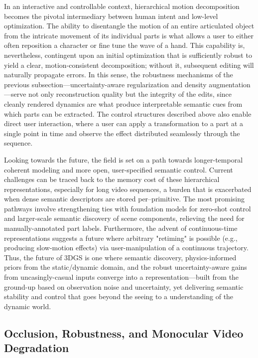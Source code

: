 \documentclass[11pt,a4paper]{article}
\begin{document}
In an interactive and controllable context, hierarchical motion decomposition becomes the pivotal intermediary between human intent and low-level optimization. The ability to disentangle the motion of an entire articulated object from the intricate movement of its individual parts is what allows a user to either often reposition a character or fine tune the wave of a hand. This capability is, nevertheless, contingent upon an initial optimization that is sufficiently robust to yield a clear, motion-consistent decomposition; without it, subsequent editing will naturally propagate errors. In this sense, the robustness mechanisms of the previous subsection---uncertainty-aware regularization and density augmentation---serve not only reconstruction quality but the integrity of the edits, since cleanly rendered dynamics are what produce interpretable semantic cues from which parts can be extracted. The control structures described above also enable direct user interaction, where a user can apply a transformation to a part at a single point in time and observe the effect distributed seamlessly through the sequence.

Looking towards the future, the field is set on a path towards longer-temporal coherent modeling and more open, user-specified semantic control. Current challenges can be traced back to the memory cost of these hierarchical representations, especially for long video sequences, a burden that is exacerbated when dense semantic descriptors are stored per--primitive. The most promising pathways involve strengthening ties with foundation models for zero-shot control and larger-scale semantic discovery of scene components, relieving the need for manually-annotated part labels. Furthermore, the advent of continuous-time representations suggests a future where arbitrary "retiming" is possible (e.g., producing slow-motion effects) via user-manipulation of a continuous trajectory. Thus, the future of 3DGS is one where semantic discovery, physics-informed priors from the static/dynamic domain, and the robust uncertainty-aware gains from uncasingly-casual inputs converge into a representation---built from the ground-up based on observation noise and uncertainty, yet delivering semantic stability and control that goes beyond the seeing to a understanding of the dynamic world.


\subsection{Occlusion, Robustness, and Monocular Video Degradation}
\end{document}
